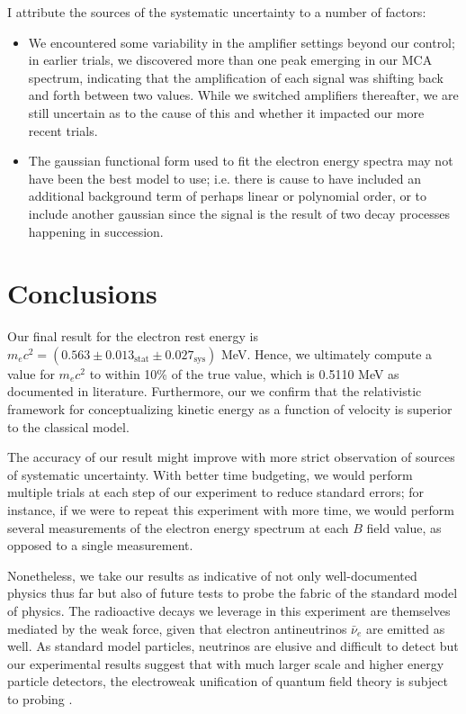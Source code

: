 \documentclass[aps,twocolumn,secnumarabic,balancelastpage,amsmath,amssymb,nofootinbib, floatfix]{revtex4-2}
\begin{document}
	I attribute the sources of the systematic uncertainty to a number of factors:
	\begin{itemize}
		\item We  encountered some variability in the amplifier settings beyond our control; in earlier trials, we discovered more than one peak emerging in our MCA spectrum, indicating that the amplification of each signal was shifting back and forth between two values. While we switched amplifiers thereafter, we are still uncertain as to the cause of this and whether it impacted our more recent trials. 
		\item The gaussian functional form used to fit the electron energy spectra may not have been the best model to use; i.e. there is cause to have included an additional background term of perhaps linear or polynomial order, or to include another gaussian since the signal is the result of two decay processes happening in succession. 
	\end{itemize}  
	
	
	\section{Conclusions}
	Our final result for the electron rest energy is $m_{e}c^{2}=(0.563\pm0.013_{\text{stat}}\pm0.027_{\text{sys}})$ MeV. Hence, we ultimately compute a value for $m_{e}c^{2}$ to within 10\% of the true value, which is 0.5110 MeV as documented in literature. Furthermore, our we confirm that the relativistic framework for conceptualizing kinetic energy as a function of velocity is superior to the classical model. 
	
	The accuracy of our result might improve with more strict observation of sources of systematic uncertainty. With better time budgeting, we would perform multiple trials at each step of our experiment to reduce standard errors; for instance, if we were to repeat this experiment with more time, we would perform several measurements of the electron energy spectrum at each $B$ field value, as opposed to a single measurement. 
	
	Nonetheless, we take our results as indicative of not only well-documented physics thus far but also of future tests to probe the fabric of the standard model of physics. The radioactive decays we leverage in this experiment are themselves mediated by the weak force, given that electron antineutrinos $\bar{\nu}_{e}$ are emitted as well. As standard model particles, neutrinos are elusive and difficult to detect but our experimental results suggest that with much larger scale and higher energy particle detectors, the electroweak unification of quantum field theory is subject to probing \cite{neutrinos}. 
	
\end{document}
